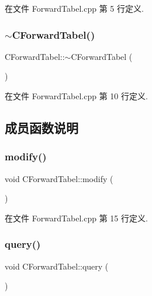 在文件 Forward\+Tabel.\+cpp 第 5 行定义.

\mbox{\label{class_c_forward_tabel_a593b0557d10c619e95110ee0997d01fe}} 
\subsubsection{\texorpdfstring{$\sim$\+C\+Forward\+Tabel()}{~CForwardTabel()}}
{\footnotesize\ttfamily C\+Forward\+Tabel\+::$\sim$\+C\+Forward\+Tabel (\begin{DoxyParamCaption}{ }\end{DoxyParamCaption})}



在文件 Forward\+Tabel.\+cpp 第 10 行定义.



\subsection{成员函数说明}
\mbox{\label{class_c_forward_tabel_afbc987ef5b55ab2fbc21721d47d623ad}} 
\subsubsection{\texorpdfstring{modify()}{modify()}}
{\footnotesize\ttfamily void C\+Forward\+Tabel\+::modify (\begin{DoxyParamCaption}{ }\end{DoxyParamCaption})}



在文件 Forward\+Tabel.\+cpp 第 15 行定义.

\mbox{\label{class_c_forward_tabel_a90efc1b05feb38559334c371a8e83019}} 
\subsubsection{\texorpdfstring{query()}{query()}}
{\footnotesize\ttfamily void C\+Forward\+Tabel\+::query (\begin{DoxyParamCaption}{ }\end{DoxyParamCaption})}



